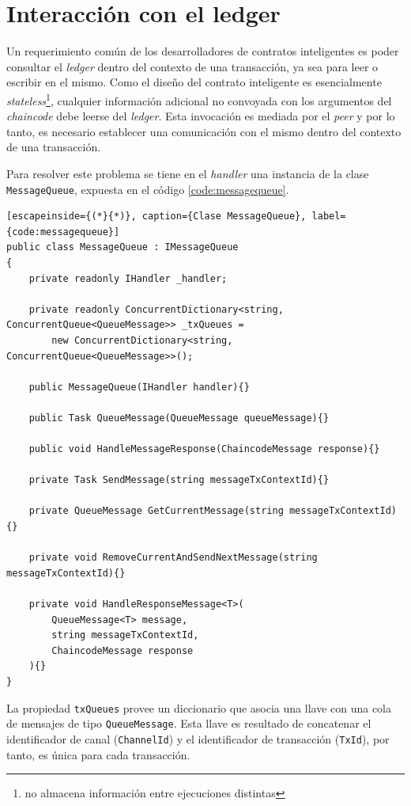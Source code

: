\section{Interacción con el ledger}\label{ledgerinteraction}
Un requerimiento común de los desarrolladores de contratos inteligentes es poder consultar el \textit{ledger} dentro del contexto de una transacción, ya sea para leer o escribir en el mismo. Como el diseño del contrato inteligente es esencialmente \textit{stateless}\footnote{no almacena información entre ejecuciones distintas}, cualquier información adicional no convoyada con los argumentos del \textit{chaincode} debe leerse del \textit{ledger}. Esta invocación es mediada por el \textit{peer} y por lo tanto, es necesario establecer una comunicación con el mismo dentro del contexto de una transacción.

Para resolver este problema se tiene en el \textit{handler} una instancia de la clase \texttt{MessageQueue}, expuesta en el código \ref{code:messagequeue}.\\

\begin{lstlisting}[escapeinside={(*}{*)}, caption={Clase MessageQueue}, label={code:messagequeue}]
public class MessageQueue : IMessageQueue
{
    private readonly IHandler _handler;

    private readonly ConcurrentDictionary<string, ConcurrentQueue<QueueMessage>> _txQueues =
        new ConcurrentDictionary<string, ConcurrentQueue<QueueMessage>>();

    public MessageQueue(IHandler handler){}

    public Task QueueMessage(QueueMessage queueMessage){}

    public void HandleMessageResponse(ChaincodeMessage response){}

    private Task SendMessage(string messageTxContextId){}

    private QueueMessage GetCurrentMessage(string messageTxContextId){}

    private void RemoveCurrentAndSendNextMessage(string messageTxContextId){}

    private void HandleResponseMessage<T>(
        QueueMessage<T> message,
        string messageTxContextId,
        ChaincodeMessage response
    ){}
}
\end{lstlisting}
La propiedad \texttt{txQueues} provee un diccionario que asocia una llave con una cola de mensajes de tipo \texttt{QueueMessage}. Esta llave es resultado de concatenar el identificador de canal (\texttt{ChannelId}) y el identificador de transacción (\texttt{TxId}), por tanto, es única para cada transacción.

